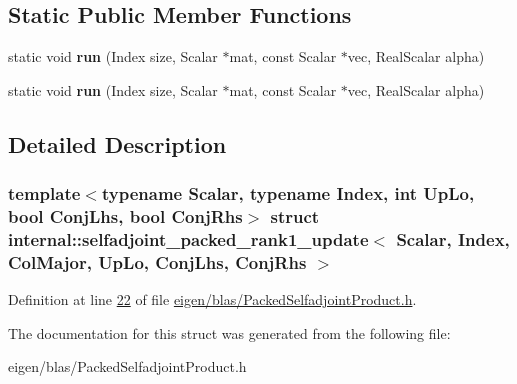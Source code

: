 \subsection*{Static Public Member Functions}
\begin{DoxyCompactItemize}
\item 
\mbox{\label{structinternal_1_1selfadjoint__packed__rank1__update_3_01_scalar_00_01_index_00_01_col_major_00_cda55a2b2bf1b1755d1ad2703b37584d_a823db1e9ff13c1fab83dc5513eafa1e8}} 
static void {\bfseries run} (Index size, Scalar $\ast$mat, const Scalar $\ast$vec, Real\+Scalar alpha)
\item 
\mbox{\label{structinternal_1_1selfadjoint__packed__rank1__update_3_01_scalar_00_01_index_00_01_col_major_00_cda55a2b2bf1b1755d1ad2703b37584d_a823db1e9ff13c1fab83dc5513eafa1e8}} 
static void {\bfseries run} (Index size, Scalar $\ast$mat, const Scalar $\ast$vec, Real\+Scalar alpha)
\end{DoxyCompactItemize}


\subsection{Detailed Description}
\subsubsection*{template$<$typename Scalar, typename Index, int Up\+Lo, bool Conj\+Lhs, bool Conj\+Rhs$>$\newline
struct internal\+::selfadjoint\+\_\+packed\+\_\+rank1\+\_\+update$<$ Scalar, Index, Col\+Major, Up\+Lo, Conj\+Lhs, Conj\+Rhs $>$}



Definition at line \hyperlink{eigen_2blas_2_packed_selfadjoint_product_8h_source_l00022}{22} of file \hyperlink{eigen_2blas_2_packed_selfadjoint_product_8h_source}{eigen/blas/\+Packed\+Selfadjoint\+Product.\+h}.



The documentation for this struct was generated from the following file\+:\begin{DoxyCompactItemize}
\item 
eigen/blas/\+Packed\+Selfadjoint\+Product.\+h\end{DoxyCompactItemize}
